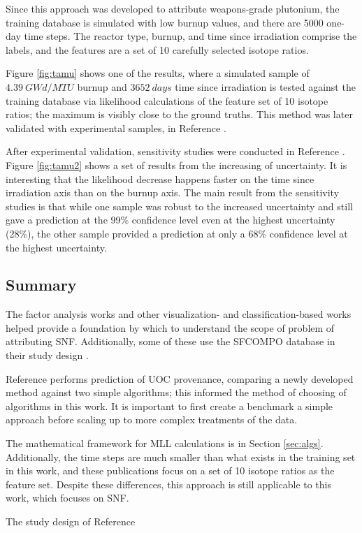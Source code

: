Since this approach was developed to attribute weapons-grade plutonium, the
training database is simulated with low burnup values, and there are 5000
one-day time steps.  The reactor type, burnup, and time since irradiation
comprise the labels, and the features are a set of 10 carefully selected
isotope ratios. 

Figure \ref{fig:tamu} shows one of the results, where a simulated sample of
$4.39\:GWd/MTU$ burnup and $3652\:days$ time since irradiation is tested
against the training database via likelihood calculations of the feature set of
10 isotope ratios; the maximum is visibly close to the ground truths.  This
method was later validated with experimental samples, in Reference
\cite{mll_validate}. 

After experimental validation, sensitivity studies were conducted in Reference
\cite{mll_sensitivity}.  Figure \ref{fig:tamu2} shows a set of results from the
increasing of uncertainty. It is interesting that the likelihood decrease
happens faster on the time since irradiation axis than on the burnup axis. The
main result from the sensitivity studies is that while one sample was robust to
the increased uncertainty and still gave a prediction at the 99\% confidence
level even at the highest uncertainty (28\%), the other sample provided a prediction
at only a 68\% confidence level at the highest uncertainty.

\subsection{Summary}

The factor analysis works \cite{nicolaou_2006, nicolaou_pu, nicolaou_2009,
nicolaou_2014, nicolaou_2015} and other visualization- and
classification-based works \cite{pu_discrimination, jones_snf_2014,
jones_viz_2014} helped provide a foundation by which to understand the scope of
problem of attributing \gls{SNF}. Additionally, some of these use the
\gls{SFCOMPO} database in their study design \cite{nicolaou_2014,
jones_viz_2014}.

Reference \cite{robel_2009} performs prediction of \gls{UOC} provenance,
comparing a newly developed method against two simple algorithms; this informed
the method of choosing of algorithms in this work. It is important to first create a
benchmark a simple approach before scaling up to more complex treatments of the
data. 

The mathematical framework for \gls{MLL} calculations is in
Section \ref{sec:algs}.  
Additionally, the time steps are much smaller than what exists in the
training set in this work, and these publications focus on a set of 10 isotope
ratios as the feature set.  Despite these differences, this approach is still
applicable to this work, which focuses on \gls{SNF}. 

The study design of Reference \cite{dayman_feasibility_2013} 
